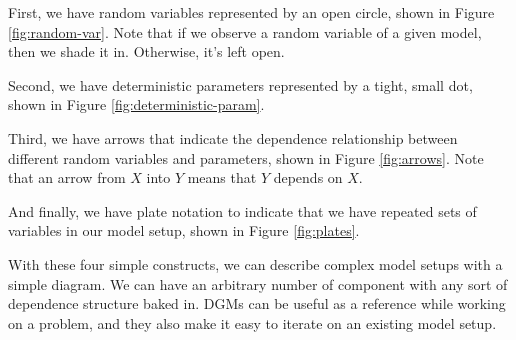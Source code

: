 First, we have random variables represented by an open circle, shown in Figure \ref{fig:random-var}. Note that if we observe a random variable of a given model, then we shade it in. Otherwise, it's left open.

Second, we have deterministic parameters represented by a tight, small dot, shown in Figure \ref{fig:deterministic-param}.

Third, we have arrows that indicate the dependence relationship between different random variables and parameters, shown in Figure \ref{fig:arrows}. Note that an arrow from $X$ into $Y$ means that $Y$ depends on $X$.

And finally, we have plate notation to indicate that we have repeated sets of variables in our model setup, shown in Figure \ref{fig:plates}.

With these four simple constructs, we can describe complex model setups with a simple diagram. We can have an arbitrary number of component with any sort of dependence structure baked in. DGMs can be useful as a reference while working on a problem, and they also make it easy to iterate on an existing model setup.

